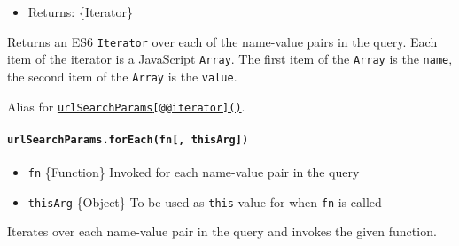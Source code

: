 \begin{itemize}
\tightlist
\item
  Returns: \{Iterator\}
\end{itemize}

Returns an ES6 \texttt{Iterator} over each of the name-value pairs in
the query. Each item of the iterator is a JavaScript \texttt{Array}. The
first item of the \texttt{Array} is the \texttt{name}, the second item
of the \texttt{Array} is the \texttt{value}.

Alias for
\hyperref[urlsearchparamssymboliterator]{\texttt{urlSearchParams{[}@@iterator{]}()}}.

\paragraph{\texorpdfstring{\texttt{urlSearchParams.forEach(fn{[},\ thisArg{]})}}{urlSearchParams.forEach(fn{[}, thisArg{]})}}\label{urlsearchparams.foreachfn-thisarg}

\begin{itemize}
\tightlist
\item
  \texttt{fn} \{Function\} Invoked for each name-value pair in the query
\item
  \texttt{thisArg} \{Object\} To be used as \texttt{this} value for when
  \texttt{fn} is called
\end{itemize}

Iterates over each name-value pair in the query and invokes the given
function.

\begin{Shaded}
\begin{Highlighting}[]
\OperatorTok{=}  \NormalTok{(}\NormalTok{)}\OperatorTok{;}
\OperatorTok{,}\OperatorTok{,}\KeywordTok{=\textgreater{}}\NormalTok{ \{}
  \OperatorTok{,}\OperatorTok{,} \OperatorTok{===}\OperatorTok{;}
\NormalTok{\})}\OperatorTok{;}
\end{Highlighting}
\end{Shaded}

